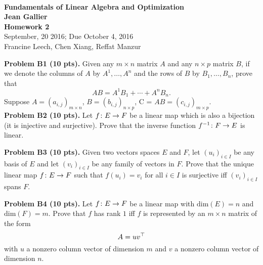 \documentclass[12pt]{article}
\begin{document}
\begin{center}
\\
\vspace{1cm}
{\Large\bf Fundamentals of Linear Algebra and Optimization\\
Jean Gallier \\
\vspace{0.5cm}
Homework 2}\\[10pt]
September, 20 2016; Due October 4, 2016\\
Francine Leech, Chen Xiang, Reffat Manzur
\end{center}


\vspace {0.25cm}\noindent
{\bf Problem B1 (10 pts).}
Given any $m\times n$ matrix $A$ and any $n\times p$
matrix $B$, if we denote the columns of $A$ by $A^1, \ldots, A^n$
and the rows of $B$ by $B_1, \ldots, B_n$,
prove that
\[
AB = A^1B_1 + \cdots + A^nB_n.
\] 
Suppose $A = (a_{i,j})_{m \times n}$, $B = (b_{i,j})_{n \times p}$, C = $AB = (c_{i,j})_{m \times p}$. \\


\vspace {0.25cm}\noindent
{\bf Problem B2 (10 pts).}
Let $f\colon E\rightarrow F$ be a linear map which is also a bijection
(it is injective and surjective). Prove that the inverse function
$f^{-1}\colon F\rightarrow E$ is linear. 


\vspace {0.25cm}\noindent
{\bf Problem B3 (10 pts).}
Given two vectors spaces $E$ and $F$, let $(u_i)_{i\in I}$
be any basis of $E$ and let $(v_i)_{i\in I}$ be any
family of vectors in $F$. Prove that the unique linear map
$f\colon E\rightarrow F$ such that $f(u_i) = v_i$ for all $i\in I$ 
is surjective iff  $(v_i)_{i\in I}$ spans $F$.

\vspace {0.25cm}\noindent
{\bf Problem B4 (10 pts).}
Let $f\colon E\rightarrow F$ be a linear map 
with $\mathrm{dim}(E) = n$ and $\mathrm{dim}(F)  = m$.
Prove that $f$ has rank $1$ iff $f$ is represented by an
$m\times n$ matrix of the form
\[
A = uv^{\top}
\]
with $u$ a nonzero column vector of dimension $m$ and $v$ a 
nonzero column vector  of dimension $n$.
\end{document}
